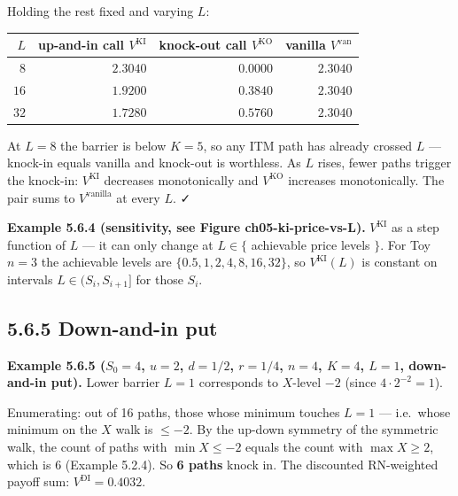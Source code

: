 \documentclass[
  10pt,
  twoside]{book}
\newcounter{none} %
\begin{document}
Holding the rest fixed and varying \(L\):

{\def\LTcaptype{none} %
\begin{table}[H]
\centering
\begin{tabular}{|r|r|r|r|}
\toprule
\(L\) & up-and-in call \(V^{\text{KI}}\) & knock-out call \(V^{\text{KO}}\) & vanilla \(V^{\text{van}}\) \\
\midrule



\(8\) & \(2.3040\) & \(0.0000\) & \(2.3040\) \\
\(16\) & \(1.9200\) & \(0.3840\) & \(2.3040\) \\
\(32\) & \(1.7280\) & \(0.5760\) & \(2.3040\) \\
\bottomrule
\end{tabular}
\end{table}
}

At \(L = 8\) the barrier is below \(K = 5\), so any ITM path has already
crossed \(L\) --- knock-in equals vanilla and knock-out is worthless. As
\(L\) rises, fewer paths trigger the knock-in: \(V^{\text{KI}}\)
decreases monotonically and \(V^{\text{KO}}\) increases monotonically.
The pair sums to \(V^{\text{vanilla}}\) at every \(L\). ✓

\textbf{Example 5.6.4 (sensitivity, see Figure ch05-ki-price-vs-L).}
\(V^{\text{KI}}\) as a step function of \(L\) --- it can only change at
\(L \in \{\) achievable price levels \(\}\). For Toy \(n = 3\) the
achievable levels are \(\{0.5, 1, 2, 4, 8, 16, 32\}\), so
\(V^{\text{KI}}(L)\) is constant on intervals \(L \in (S_i, S_{i+1}]\)
for those \(S_i\).

\subsection{5.6.5 Down-and-in put}\label{down-and-in-put}

\textbf{Example 5.6.5 (\(S_0 = 4\), \(u = 2\), \(d = 1/2\), \(r = 1/4\),
\(n = 4\), \(K = 4\), \(L = 1\), down-and-in put).} Lower barrier
\(L = 1\) corresponds to \(X\)-level \(-2\) (since
\(4 \cdot 2^{-2} = 1\)).

Enumerating: out of 16 paths, those whose minimum touches \(L = 1\) ---
i.e.~whose minimum on the \(X\) walk is \(\le -2\). By the up-down
symmetry of the symmetric walk, the count of paths with
\(\min X \le -2\) equals the count with \(\max X \ge 2\), which is \(6\)
(Example 5.2.4). So \textbf{6 paths} knock in. The discounted
RN-weighted payoff sum: \(V^{\text{DI}} = 0.4032\).
\end{document}
